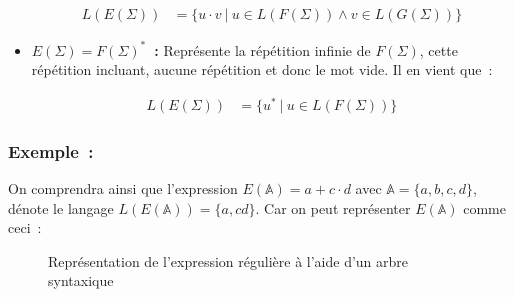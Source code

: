 \documentclass[12pt]{article}
\begin{document}
\begin{itemize}
        \begin{align}
            L(E(\Sigma)) & = \{u \cdot v ~|~ u \in L(F(\Sigma)) \land v \in L(G(\Sigma)) \}
        \end{align}

        \vphantom{}

    \item[\textbullet] \textbf{\(E(\Sigma) = F(\Sigma)^* \)~:} Représente la
        répétition infinie de \(F(\Sigma)\), cette répétition incluant, aucune
        répétition et donc le mot vide. Il en vient que~:

        \begin{align}
            L(E(\Sigma)) & = \{u^* ~|~ u \in L(F(\Sigma))\}
        \end{align}
\end{itemize}

\subsubsection*{Exemple~:}

On comprendra ainsi que l'expression \(E(\mathbb{A}) = a+c \cdot d\) avec
\(\mathbb{A} = \{a, b, c, d\}\), dénote le langage \(L(E(\mathbb{A})) = \{a,
cd\}\). Car on peut représenter \(E(\mathbb{A})\) comme ceci~:

\begin{figure}[H]
    \centering
    \captionsetup{type=figure,justification=centering}
    \caption{
        Représentation de l'expression régulière à l'aide d'un arbre syntaxique
    }\label{fig:arbre_syn}
\end{figure}
\end{document}
